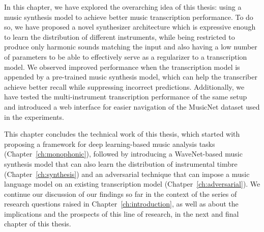 In this chapter, we have explored the overarching idea of this thesis: using a music synthesis model to achieve better music transcription performance.
To do so, we have proposed a novel synthesizer architecture which is expressive enough to learn the distribution of different instruments, while being restricted to produce only harmonic sounds matching the input and also having a low number of parameters to be able to effectively serve as a regularizer to a transcription model.
We observed improved performance when the transcription model is appended by a pre-trained music synthesis model, which can help the transcriber achieve better recall while suppressing incorrect predictions.
Additionally, we have tested the multi-instrument transcription performance of the same setup and introduced a web interface for easier navigation of the MusicNet dataset used in the experiments.

This chapter concludes the technical work of this thesis, which started with proposing a framework for deep learning-based music analysis tasks (Chapter~\ref{ch:monophonic}), followed by introducing a WaveNet-based music synthesis model that can also learn the distribution of instrumental timbre (Chapter~\ref{ch:synthesis}) and an adversarial technique that can impose a music language model on an existing transcription model (Chatper~\ref{ch:adversarial}).
We continue our discussion of our findings so far in the context of the series of research questions raised in Chapter~\ref{ch:introduction}, as well as about the implications and the prospects of this line of research, in the next and final chapter of this thesis.


